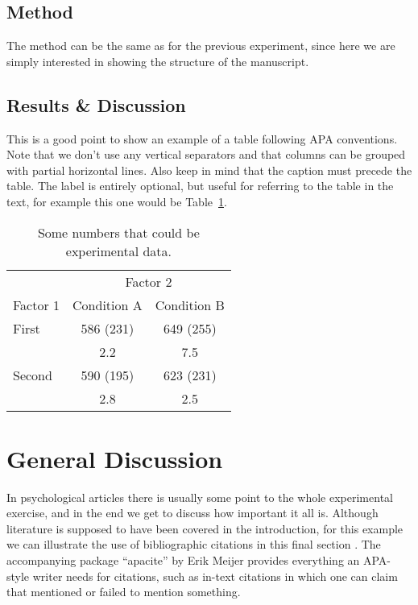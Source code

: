\documentclass[man]{apa}
\begin{document}
\subsection{Method}
The method can be the same as for the previous experiment, since here we are simply interested in showing the structure of the manuscript.
\subsection{Results \& Discussion}
This is a good point to show an example of a table following APA conventions. Note that we don't use any vertical separators and that columns can be grouped with partial horizontal lines.  
Also keep in mind that the caption must precede the table. The label is entirely optional, but useful for referring to the table in the text, for example this one would be Table~\ref{tab:tab1}.
\begin{table}[tbp]
\caption{Some numbers that could be experimental data.}
\label{tab:tab1}
\begin{tabular}{lcc}\hline
          & \multicolumn{2}{c}{Factor 2} \\ \cline{2-3}
Factor 1  & Condition A  & Condition B   \\ \hline
First     & 586 (231)    & 649 (255)     \\
          &    2.2       &    7.5        \\
Second    & 590 (195)    & 623 (231)     \\
          &    2.8       &    2.5        \\ \hline
\end{tabular}
\end{table}

\section{General Discussion}
In psychological articles there is usually some point to the whole experimental exercise, and in the end we get to discuss how important it all is.  Although literature is supposed to have been covered in the introduction, for this example we can illustrate the use of bibliographic citations in this final section \cite{art1}. The accompanying package ``apacite'' by Erik Meijer provides everything an APA-style writer needs for citations, such as in-text citations in which one can claim that  mentioned or failed to mention something.


\end{document}
